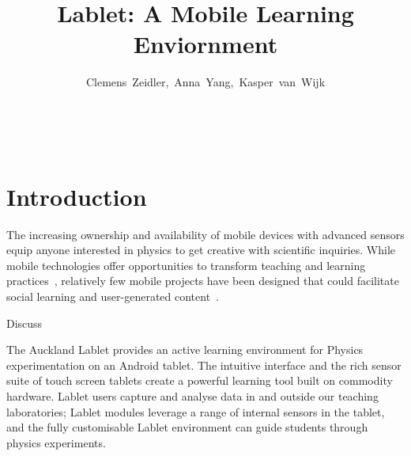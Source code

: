 \documentclass{sigchi}
\begin{document}
\title{Lablet: A Mobile Learning Enviornment}


\author{
	\alignauthor \mbox{Clemens Zeidler, Anna Yang, Kasper van Wijk}\\
		\\
		\\
		\\
}

\maketitle


\begin{abstract}
\end{abstract}





\section{Introduction}

The increasing ownership and availability of mobile devices with
advanced sensors equip anyone interested in physics to get creative
with scientific inquiries.  While mobile technologies offer
opportunities to transform teaching and learning
practices~\cite{karnad2014trends, Kukulska2010}, relatively few mobile
projects have been designed that could facilitate social learning and
user-generated content~\cite{Frohberg2009}. 

Discuss \cite{Kearney2012,Etkina2006,Millar2002,Trumper2003}

The Auckland Lablet provides an active learning environment for
Physics experimentation on an Android tablet.  The intuitive interface
and the rich sensor suite of touch screen tablets create a powerful
learning tool built on commodity hardware.  Lablet users capture and
analyse data in and outside our teaching laboratories; Lablet modules
leverage a range of internal sensors in the tablet, and the fully
customisable Lablet environment can guide students through physics
experiments.
\end{document}
